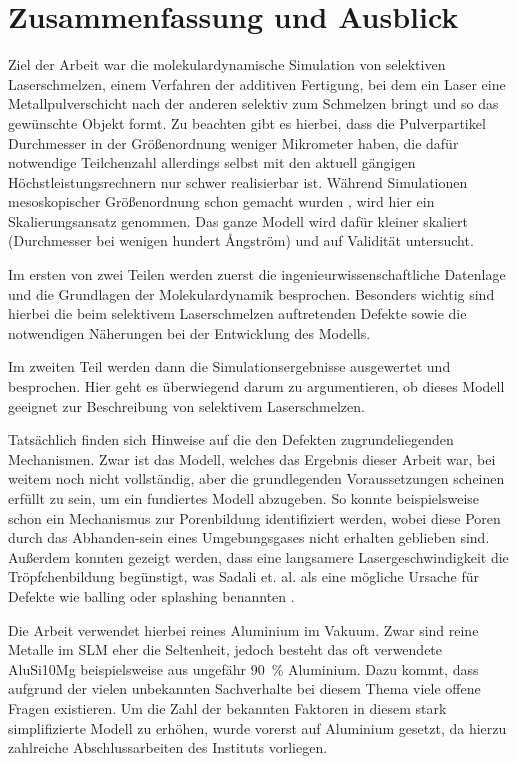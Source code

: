 \chapter{Zusammenfassung und Ausblick}



Ziel der Arbeit war die molekulardynamische Simulation von selektiven Laserschmelzen, einem
Verfahren der additiven Fertigung, bei dem ein Laser eine Metallpulverschicht nach der anderen
selektiv zum Schmelzen bringt und so das gewünschte Objekt formt. Zu beachten gibt es hierbei,
dass die Pulverpartikel Durchmesser in der Größenordnung weniger Mikrometer haben, die dafür
notwendige Teilchenzahl allerdings selbst mit den aktuell gängigen Höchstleistungsrechnern nur
schwer realisierbar ist. Während Simulationen mesoskopischer Größenordnung schon gemacht wurden
\cite{panwisawas2017mesoscale}, wird hier ein Skalierungsansatz genommen. Das ganze Modell wird
dafür kleiner skaliert (Durchmesser bei wenigen hundert \AA ngström) und auf Validität untersucht.

Im ersten von zwei Teilen werden zuerst die ingenieurwissenschaftliche Datenlage und die
Grundlagen der Molekulardynamik besprochen. Besonders wichtig sind hierbei die beim selektivem
Laserschmelzen auftretenden Defekte sowie die notwendigen Näherungen bei der Entwicklung des
Modells.

Im zweiten Teil werden dann die Simulationsergebnisse ausgewertet und besprochen. Hier geht es
überwiegend darum zu argumentieren, ob dieses Modell geeignet zur Beschreibung von selektivem
Laserschmelzen.

Tatsächlich finden sich Hinweise auf die den Defekten zugrundeliegenden Mechanismen. Zwar ist
das Modell, welches das Ergebnis dieser Arbeit war, bei weitem noch nicht vollständig, aber die
grundlegenden Voraussetzungen scheinen erfüllt zu sein, um ein fundiertes Modell abzugeben.
So konnte beispielsweise schon ein Mechanismus zur Porenbildung identifiziert werden, wobei diese
Poren durch das Abhanden-sein eines Umgebungsgases nicht erhalten geblieben sind. Außerdem konnten
gezeigt werden, dass eine langsamere Lasergeschwindigkeit die Tröpfchenbildung begünstigt, was
Sadali et. al. als eine mögliche Ursache für Defekte wie balling oder splashing benannten
\cite{sadali2020influence}.

Die Arbeit verwendet hierbei reines Aluminium im Vakuum. Zwar sind reine Metalle im SLM
eher die Seltenheit, jedoch besteht das oft verwendete AluSi10Mg beispielsweise aus ungefähr
\SI{90}{\percent} Aluminium. Dazu kommt, dass aufgrund der vielen unbekannten Sachverhalte
bei diesem Thema viele offene Fragen existieren. Um die Zahl der bekannten Faktoren in diesem
stark simplifizierte Modell zu erhöhen, wurde vorerst auf Aluminium gesetzt, da hierzu zahlreiche
Abschlussarbeiten des Instituts vorliegen.

